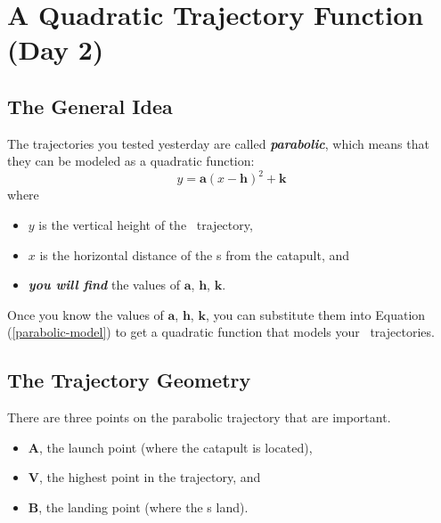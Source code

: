 \section{A Quadratic Trajectory Function (Day 2)}






\subsection{The General Idea}

The trajectories you tested yesterday are called {\bfseries\itshape parabolic},
which means that they can be modeled as a quadratic function:
\begin{equation}\label{parabolic-model}
    y = \bm{a}(x-\bm{h})^2 + \bm{k}
\end{equation} 
where 
\begin{itemize}[nosep]
    \item $y$ is the vertical height of the \mymm~trajectory, 
    \item $x$ is the horizontal distance of the \mymm{}s from the catapult, and
    \item {\bfseries\itshape you will find} the values of $\bm{a}$, $\bm{h}$, $\bm{k}$.
\end{itemize}

Once you know the values of $\bm{a}$, $\bm{h}$, $\bm{k}$, 
you can substitute them into Equation (\ref{parabolic-model}) to get a 
quadratic function that models your \mymm~trajectories.





\subsection{The Trajectory Geometry}

There are three points on the parabolic trajectory that are important.
\begin{itemize}[nosep]
    \item $\bm{A}$, the launch point (where the catapult is located),
    \item $\bm{V}$, the highest point in the trajectory, and
    \item $\bm{B}$, the landing point (where the \mymm{}s land). 
\end{itemize}

